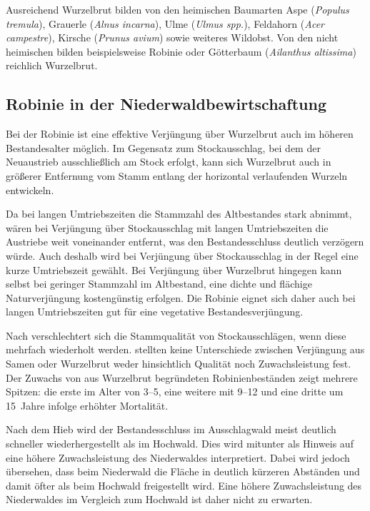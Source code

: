 \documentclass[twocolumn]{scrartcl}
\begin{document}
Ausreichend Wurzelbrut bilden von den heimischen Baumarten Aspe
(\emph{Populus tremula}), Grauerle (\emph{Alnus incarna}), Ulme
(\emph{Ulmus spp.}), Feldahorn (\emph{Acer campestre}), Kirsche
(\emph{Prunus avium}) sowie weiteres Wildobst. Von den nicht
heimischen bilden beispielsweise Robinie oder Götterbaum
(\emph{Ailanthus altissima}) reichlich Wurzelbrut.

\subsection{Robinie in der Niederwaldbewirtschaftung}

Bei der Robinie ist eine effektive Verjüngung über Wurzelbrut auch im
höheren Bestandesalter möglich. Im Gegensatz zum Stockausschlag, bei
dem der Neuaustrieb ausschließlich am Stock erfolgt, kann sich
Wurzelbrut auch in größerer Entfernung vom Stamm entlang der
horizontal verlaufenden Wurzeln entwickeln.

Da bei langen Umtriebszeiten die Stammzahl des Altbestandes stark
abnimmt, wären bei Verjüngung über Stockausschlag mit langen
Umtriebszeiten die Austriebe weit voneinander entfernt, was den
Bestandesschluss deutlich verzögern würde. Auch deshalb wird bei
Verjüngung über Stockausschlag in der Regel eine kurze Umtriebszeit
gewählt. Bei Verjüngung über Wurzelbrut hingegen kann selbst bei
geringer Stammzahl im Altbestand, eine dichte und flächige
Naturverjüngung kostengünstig erfolgen. Die Robinie eignet sich daher
auch bei langen Umtriebszeiten gut für eine vegetative
Bestandesverjüngung.

Nach \citet{iski2019robinie} verschlechtert sich die Stammqualität von
Stockausschlägen, wenn diese mehrfach wiederholt
werden. \citet{redei2011robinieWaldbau} stellten keine Unterschiede
zwischen Verjüngung aus Samen oder Wurzelbrut weder hinsichtlich
Qualität noch Zuwachsleistung fest. Der Zuwachs von aus Wurzelbrut
begründeten Robinienbeständen zeigt mehrere Spitzen: die erste im
Alter von 3–5, eine weitere mit 9–12 und eine dritte um 15~Jahre
infolge erhöhter Mortalität.

Nach dem Hieb wird der Bestandesschluss im Ausschlagwald meist
deutlich schneller wiederhergestellt als im Hochwald. Dies wird
mitunter als Hinweis auf eine höhere Zuwachsleistung des Niederwaldes
interpretiert. Dabei wird jedoch übersehen, dass beim Niederwald die
Fläche in deutlich kürzeren Abständen und damit öfter als beim
Hochwald freigestellt wird. Eine höhere Zuwachsleistung des
Niederwaldes im Vergleich zum Hochwald ist daher nicht zu erwarten.
\end{document}

